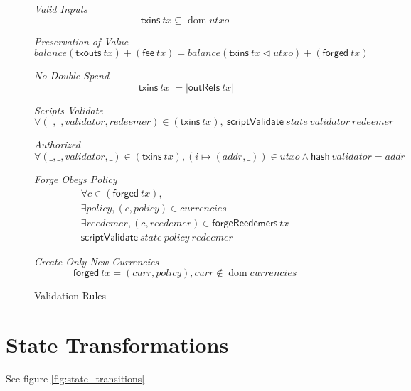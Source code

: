 \documentclass[11pt,a4paper]{article}
\DeclareMathOperator{\dom}{dom}
\newcommand{\restrictdom}{\lhd}
\newcommand{\var}[1]{\mathit{#1}}
\newcommand{\fun}[1]{\mathsf{#1}}
\newcommand{\scriptValidate}[3]{\fun{scriptValidate} ~ \var{#1} ~ \var{#2} ~ \var{#3}}
\newcommand{\txins}[1]{\fun{txins}\ \var{#1}}
\newcommand{\txouts}[1]{\fun{txouts}\ \var{#1}}
\newcommand{\hash}[1]{\fun{hash}\ \var{#1}}
\newcommand{\forged}[1]{\fun{forged}\ \var{#1}}
\newcommand{\forgeReedemers}[1]{\fun{forgeReedemers}\ \var{#1}}
\newcommand{\fee}[1]{\fun{fee}\ \var{#1}}
\newcommand{\created}[1]{\fun{forged}\ \var{#1}}
\newcommand{\outRefs}[1]{\fun{outRefs}\ \var{#1}}
\begin{document}
\begin{figure}
\emph{Valid Inputs}
%
\begin{equation*}
\txins{tx} \subseteq \dom \var{utxo}
\end{equation*}

\emph{Preservation of Value}
%
\begin{equation*}
balance (\txouts tx) + (\fee tx)
  = balance (\txins tx \restrictdom utxo) + (\forged tx)
\end{equation*}

\emph{No Double Spend}
%
\begin{equation*}
\lvert \txins tx \rvert = \lvert \outRefs tx\rvert
\end{equation*}

\emph{Scripts Validate}
%
\begin{equation*}
\forall (\_, \_, validator, redeemer)\in(\txins tx),
~ \scriptValidate{state}{validator}{redeemer}
\end{equation*}

\emph{Authorized}
%
\begin{equation*}
  \forall (\_, \_, validator, \_)\in(\txins tx),
  (i \mapsto (addr, \_)) \in \var{utxo} \land \hash validator = addr
\end{equation*}

\emph{Forge Obeys Policy}
%
\begin{equation*}
\begin{array}{c}
\forall c\in(\forged tx), \\
\exists policy, (c, policy) \in \var{currencies} \\
\exists reedemer, (c, reedemer) \in \forgeReedemers tx \\
\scriptValidate{state}{policy}{redeemer}
\end{array}
\end{equation*}

\emph{Create Only New Currencies}
%
\begin{equation*}
\created tx = (curr, policy), curr \notin \dom currencies
\end{equation*}

\caption{Validation Rules}
\label{fig:validation_rules}
\end{figure}

\section{State Transformations}
See figure \cref{fig:state_transitions} 
\end{document}
